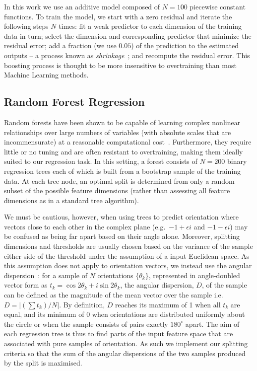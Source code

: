 \documentclass[runningheads,a4paper]{llncs}
\def\ie{i.e.}
\def\eg{e.g.}
\newcommand{\comment}[1]{}
\begin{document}
In this work we use an additive model composed of $N=100$ piecewise constant functions. To train the model, we start with a zero residual and iterate the following steps $N$ times: fit a weak predictor to each dimension of the training data in turn; select the dimension and corresponding predictor that minimize the residual error; add a fraction (we use $0.05$) of the prediction to the estimated outputs -- a process known as \emph{shrinkage}~\cite{Friedman_AoS01}; and recompute the residual error. This boosting process is thought to be more insensitive to overtraining than most Machine Learning methods.


\subsection{Random Forest Regression}
\label{s:learning_forest}
Random forests have been shown to be capable of learning complex nonlinear relationships over large numbers of variables (with absolute scales that are incommensurate) at a reasonable computational cost~\cite{Breiman_ML01}. Furthermore, they require little or no tuning and are often resistant to overtraining, making them ideally suited to our regression task. In this setting, a forest consists of $N=200$ binary regression trees each of which is built from a bootstrap sample of the training data. At each tree node, an optimal split is determined from only a random subset of the possible feature dimensions (rather than assessing all feature dimensions as in a standard tree algorithm).

We must be cautious, however, when using trees to predict orientation where vectors close to each other in the complex plane (\eg~$-1+\epsilon i$ and $-1-\epsilon i$) may be confused as being far apart based on their angle alone. Moreover, splitting dimensions and thresholds are usually chosen based on the variance of the sample either side of the threshold under the assumption of a input Euclidean space.
\comment{One reviewer complained about this previous sentence}%
As this assumption does not apply to orientation vectors, we instead use the angular dispersion~\cite{Mardia_Jupp_00}: for a sample of $N$ orientations $\{\theta_k\}$, represented in angle-doubled vector form as $t_k = \cos 2\theta_k + i\sin 2\theta_k$, the angular dispersion, $D$, of the sample can be defined as the magnitude of the mean vector over the sample \ie~$D = |(\sum{t_k})/N|$.
%
%
By definition, $D$ reaches its maximum of 1 when all $t_k$ are equal, and its minimum of 0 when orientations are distributed uniformly about the circle or when the sample consists of pairs exactly $180^\circ$ apart. The aim of each regression tree is thus to find parts of the input feature space that are associated with pure samples of orientation. As such we implement our splitting criteria so that the sum of the angular dispersions of the two samples produced by the split is maximised.
\end{document}
